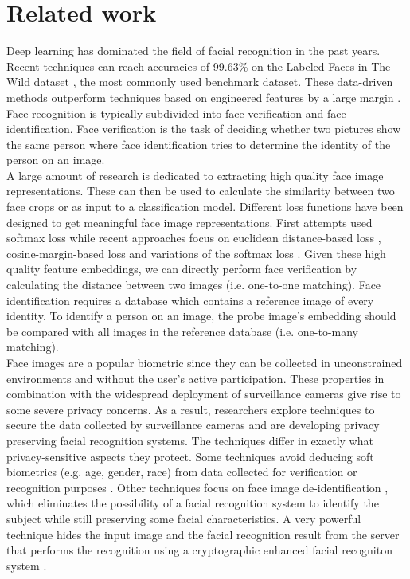 \documentclass[letterpaper]{article} %
\begin{document}
\section{Related work}
\label{section:related}
Deep learning has dominated the field of facial recognition in the past years. Recent techniques can reach accuracies of 99.63\% \cite{schroff2015facenet} on the Labeled Faces in The Wild dataset \cite{huang2008labeled}, the most commonly used benchmark dataset. These data-driven methods outperform techniques based on engineered features by a large margin \cite{masi2018deep}. Face recognition is typically subdivided into face verification and face identification. Face verification is the task of deciding whether two pictures show the same person where face identification tries to determine the identity of the person on an image.
\\
\newline
A large amount of research is dedicated to extracting high quality face image representations. These can then be used to calculate the similarity between two face crops or as input to a classification model. Different loss functions have been designed to get meaningful face image representations. First attempts used softmax loss \cite{sun2014deep} while recent approaches focus on euclidean distance-based loss \cite{schroff2015facenet}, cosine-margin-based loss \cite{wang2017normface} and variations of the softmax loss \cite{deng2019arcface}. Given these high quality feature embeddings, we can directly perform face verification by calculating the distance between two images (i.e. one-to-one matching). Face identification requires a database which contains a reference image of every identity. To identify a person on an image, the probe image's embedding should be compared with all images in the reference database (i.e. one-to-many matching).
\\
\newline
Face images are a popular biometric since they can be collected in unconstrained environments and without the user's active participation. These properties in combination with the widespread deployment of surveillance cameras give rise to some severe privacy concerns.  As a result, researchers explore techniques to secure the data collected by surveillance cameras and are developing privacy preserving facial recognition systems. The techniques differ in exactly what privacy-sensitive aspects they protect. Some techniques avoid deducing soft biometrics (e.g. age, gender, race) from data collected for verification or recognition purposes \cite{mirjalili2018gender, mirjalili2020privacynet}. Other techniques focus on face image de-identification \cite{newton2005preserving}, which eliminates the possibility of a facial recognition system to identify the subject while still preserving some facial characteristics. A very powerful technique hides the input image and the facial recognition result from the server that performs the recognition using a cryptographic enhanced facial recogniton system \cite{erkin2009privacy}.
\end{document}
